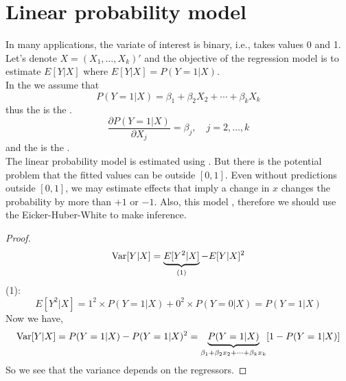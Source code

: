 \ChapterHeading

\section{Linear probability model}
In many applications, the variate of interest is binary, i.e., takes values 0 and 1.
Let's denote $X = (X_1,\ldots,X_k)'$ and the objective of the regression model is to estimate $E[Y|X]$
where $E[Y|X] = P(Y=1|X)$.\\

In the  we assume that
\begin{equation}
    P(Y=1|X) = \beta_1 + \beta_2 X_2 + \cdots + \beta_k X_k
\end{equation}
thus the  is the .
\begin{equation}
    \frac{\partial P(Y=1|X)}{\partial X_j} = \beta_j,\quad j=2,\ldots,k
\end{equation}
and the  is the .\\

The linear probability model is estimated using .
But there is the potential problem that the fitted values can be outside $[0,1]$.
Even without predictions outside $[0,1]$, we may estimate effects that imply a change in $x$ changes the probability by more than $+1$ or $-1$.
Also, this model , 
therefore we should use the Eicker-Huber-White  to make inference.
\begin{proof}
    \begin{equation*}
        \operatorname{Var}[Y|X] = \underbrace{E[Y^2|X]}_{(1)} - E[Y|X]^2
    \end{equation*}
    (1):
    \begin{equation*}
        E[Y^2|X] = 1^2\times P(Y=1|X)+0^2\times P(Y=0|X) = P(Y=1|X)
    \end{equation*}
    Now we have,
    \begin{equation*}
        \operatorname{Var}[Y|X] = P(Y=1|X) - P(Y=1|X)^2 = \underbrace{P(Y=1|X)}_{\beta_1+\beta_2 x_2+\cdots+\beta_k x_k}[1-P(Y=1|X)]
    \end{equation*}
    So we see that the variance depends on the regressors.
\end{proof}

